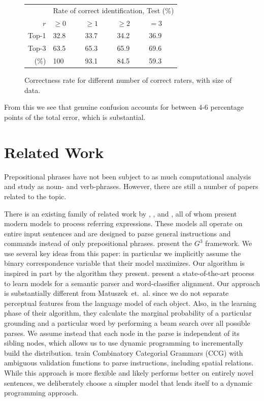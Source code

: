 \documentclass[conference]{IEEEtran}
\numberwithin{equation}{section}
\begin{document}
\begin{figure}[h!tb]
  \centering
  \begin{tabular}{|r|m{1.2cm}m{1.2cm}m{1.2cm}m{1.2cm}|}\hline
  & \multicolumn{4}{c|}{Rate of correct identification, Test (\%)} \\
  $r$ & $\geq 0$ & $\geq 1$ & $\geq 2$ & $=3$ \\\hline
  Top-1 & 32.8 & 33.7 & 34.2 & 36.9 \\
  Top-3 & 63.5 & 65.3 & 65.9 & 69.6 \\\hline
  (\%) & 100 & 93.1 & 84.5 & 59.3 \\\hline
  \end{tabular}
  \caption{Correctness rate for different number of correct raters, with size of data.}
  \label{fig:interrater}
\end{figure}

From this we see that genuine confusion accounts for between 4-6 percentage points of the total error, which is substantial.

\section{Related Work}

Prepositional phrases have not been subject to as much computational analysis and study as noun- and verb-phrases. However, there are still a number of papers related to the topic. 

There is an existing family of related work by \citet{tellex2011understanding}, \citet{UW_RSE_ICML2012}, and \citet{artzi2013weakly}, all of whom present modern models to process referring expressions. These models all operate on entire input sentences and are designed to parse general instructions and commands instead of only prepositional phrases. 
\citet{tellex2011understanding} present the $G^3$ framework. We use several key ideas from this paper: in particular we implicitly assume the binary correspondence variable that their model maximizes. Our algorithm is inspired in part by the algorithm they present.
\citet{UW_RSE_ICML2012} present a state-of-the-art process to learn models for a semantic parser and word-classifier alignment. Our approach is substantially different from Matuszek~et.~al. since we do not separate perceptual features from the language model of each object. Also, in the learning phase of their algorithm, they calculate the marginal probability of a particular grounding and a particular word by performing a beam search over all possible parses. We assume instead that each node in the parse is independent of its sibling nodes, which allows us to use dynamic programming to incrementally build the distribution.
\citet{artzi2013weakly} train Combinatory Categorial Grammars (CCG) with ambiguous validation functions to parse instructions, including spatial relations. While this approach is more flexible and likely performs better on entirely novel sentences, we deliberately choose a simpler model that lends itself to a dynamic programming approach.
\end{document}

